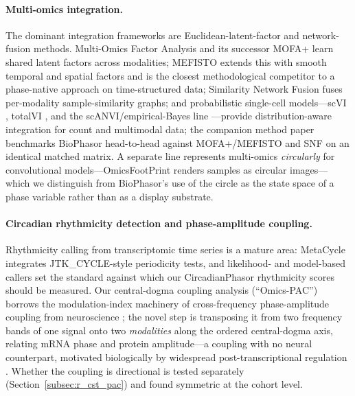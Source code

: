 \documentclass[preprint,12pt,amsmath,amssymb,superscriptaddress,floatfix]{revtex4-2}
\begin{document}
\paragraph{Multi-omics integration.}
The dominant integration frameworks are Euclidean-latent-factor and
network-fusion methods. Multi-Omics Factor Analysis \citep{argelaguet2018} and
its successor MOFA+ \citep{argelaguet2020} learn shared latent factors across
modalities; MEFISTO \citep{velten2022} extends this with smooth temporal and
spatial factors and is the closest methodological competitor to a phase-native
approach on time-structured data; Similarity Network Fusion \citep{wang2014}
fuses per-modality sample-similarity graphs; and probabilistic single-cell
models---scVI \citep{lopez2018}, totalVI \citep{gayoso2021}, and the
scANVI/empirical-Bayes line \citep{xu2021,boyeau2023}---provide
distribution-aware integration for count and multimodal data; the companion
method paper~\cite{biophasor_platform} benchmarks BioPhasor head-to-head against
MOFA+/MEFISTO and SNF on an identical matched matrix. A separate line represents
multi-omics \emph{circularly} for
convolutional models---OmicsFootPrint \citep{njoku2024} renders samples as
circular images---which we distinguish from BioPhasor's use of the circle as
the state space of a phase variable rather than as a display substrate.

\paragraph{Circadian rhythmicity detection and phase-amplitude coupling.}
Rhythmicity calling from transcriptomic time series is a mature area: MetaCycle
\citep{wu2016} integrates JTK\_CYCLE-style periodicity tests, and likelihood- and
model-based callers \citep{braun2018,ding2021,rubioponce2021} set the standard
against which our CircadianPhasor rhythmicity scores should be measured. Our
central-dogma coupling analysis (``Omics-PAC'') borrows the modulation-index
machinery of cross-frequency phase-amplitude coupling from neuroscience
\citep{scherer2022}; the novel step is transposing it from two frequency bands
of one signal onto two \emph{modalities} along the ordered central-dogma axis,
relating mRNA phase and protein amplitude---a coupling with no neural
counterpart, motivated biologically by widespread post-transcriptional
regulation \citep{srivastava2022}. Whether the coupling is directional is tested
separately (Section~\ref{subsec:r_cst_pac}) and found symmetric at the cohort
level.
\end{document}
